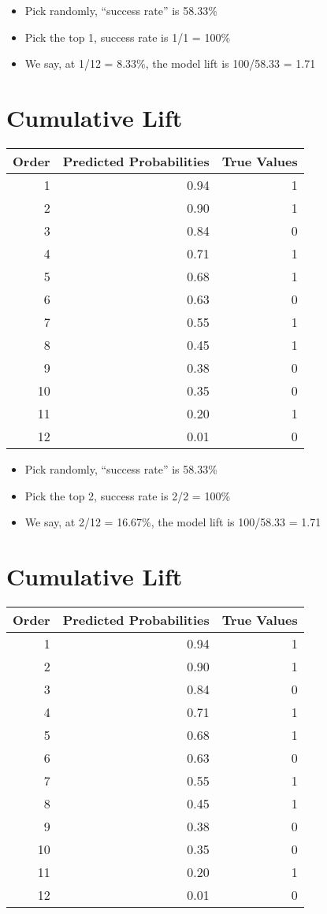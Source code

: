 \documentclass[
]{article}
\providecommand{\tightlist}{%
  \setlength{\itemsep}{0pt}\setlength{\parskip}{0pt}}
\begin{document}
\begin{itemize}
\tightlist
\item
  Pick randomly, ``success rate'' is 58.33\%
\item
  Pick the top 1, success rate is 1/1 = 100\%
\item
  We say, at 1/12 = 8.33\%, the model lift is 100/58.33 = 1.71
\end{itemize}

\hypertarget{cumulative-lift-3}{%
\section{Cumulative Lift}\label{cumulative-lift-3}}

\begin{longtable}[]{@{}rrr@{}}
\toprule
Order & Predicted Probabilities & True Values\tabularnewline
\midrule
\endhead
1 & 0.94 & 1\tabularnewline
2 & 0.90 & 1\tabularnewline
3 & 0.84 & 0\tabularnewline
4 & 0.71 & 1\tabularnewline
5 & 0.68 & 1\tabularnewline
6 & 0.63 & 0\tabularnewline
7 & 0.55 & 1\tabularnewline
8 & 0.45 & 1\tabularnewline
9 & 0.38 & 0\tabularnewline
10 & 0.35 & 0\tabularnewline
11 & 0.20 & 1\tabularnewline
12 & 0.01 & 0\tabularnewline
\bottomrule
\end{longtable}

\begin{itemize}
\tightlist
\item
  Pick randomly, ``success rate'' is 58.33\%
\item
  Pick the top 2, success rate is 2/2 = 100\%
\item
  We say, at 2/12 = 16.67\%, the model lift is 100/58.33 = 1.71
\end{itemize}

\hypertarget{cumulative-lift-4}{%
\section{Cumulative Lift}\label{cumulative-lift-4}}

\begin{longtable}[]{@{}rrr@{}}
\toprule
Order & Predicted Probabilities & True Values\tabularnewline
\midrule
\endhead
1 & 0.94 & 1\tabularnewline
2 & 0.90 & 1\tabularnewline
3 & 0.84 & 0\tabularnewline
4 & 0.71 & 1\tabularnewline
5 & 0.68 & 1\tabularnewline
6 & 0.63 & 0\tabularnewline
7 & 0.55 & 1\tabularnewline
8 & 0.45 & 1\tabularnewline
9 & 0.38 & 0\tabularnewline
10 & 0.35 & 0\tabularnewline
11 & 0.20 & 1\tabularnewline
12 & 0.01 & 0\tabularnewline
\bottomrule
\end{longtable}
\end{document}
